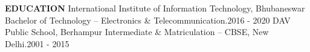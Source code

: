 \documentclass[a4paper, 12pt]{article}
\begin{document}
\vspace{-3cm}

\section*{}
\begin{vwcol}[widths={0.2, 0.8}, justify=flush, sep=0.7cm, rule=0pt, indent=1em]
\large{\textbf{\textcolor{uclagold}{EDUCATION}}}\newline\newline\newline\newline\newline\newline\newline
\large{International Institute of Information Technology, Bhubaneswar}\vspace{-0.05cm}\newline
\small{\textcolor{frenchblue}{Bachelor of Technology} -- \textcolor{frenchblue}{Electronics \& Telecommunication}}.\hspace{3.05cm}\tiny{2016 - 2020}\vspace{0.2cm}\newline
\large{DAV Public School, Berhampur}\vspace{-0.05cm}\newline
\small{\textcolor{frenchblue}{Intermediate \& Matriculation} -- \textcolor{frenchblue}{CBSE, New Delhi}}.\hspace{4.65cm}\tiny{2001 - 2015}\vspace{-0.05cm}\newline
\normalsize
\end{vwcol}

\vspace{-2.2cm}
\end{document}
